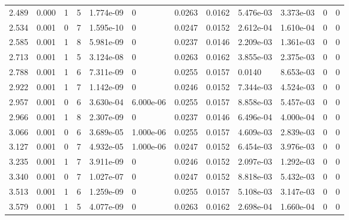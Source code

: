 \documentclass[preview]{standalone}
\begin{document}
{{\begin{tabular}{L{1.2cm}C{1.2cm} C{0.3cm}C{0.5cm} C{1.4cm}C{1.4cm} C{1.4cm}C{1.4cm} C{1.6cm}C{1.6cm} C{1.6cm}C{1.6cm}}
  2.489  &  0.000  & 1     &  5 &  1.774e-09  & 0  &  0.0263&   0.0162& 5.476e-03 & 3.373e-03   &  0 & 0  \\ 
  2.534  &  0.001  & 0     &  7 &  1.595e-10  & 0  &  0.0247&   0.0152& 2.612e-04 & 1.610e-04   &  0 & 0  \\ 
  2.585  &  0.001  & 1     &  8 &  5.981e-09  & 0  &  0.0237&   0.0146& 2.209e-03 & 1.361e-03   &  0 & 0  \\ 
  2.713  &  0.001  & 1     &  5 &  3.124e-08  & 0  &  0.0263&   0.0162& 3.855e-03 & 2.375e-03   &  0 & 0  \\ 
  2.788  &  0.001  & 1     &  6 &  7.311e-09  & 0  &  0.0255&   0.0157& 0.0140 & 8.653e-03   &  0 & 0  \\ 
  2.922  &  0.001  & 1     &  7 &  1.142e-09  & 0  &  0.0246&   0.0152& 7.344e-03 & 4.524e-03   &  0 & 0  \\ 
  2.957  &  0.001  & 0     &  6 &  3.630e-04  & 6.000e-06  &  0.0255&   0.0157& 8.858e-03 & 5.457e-03   &  0 & 0  \\ 
  2.966  &  0.001  & 1     &  8 &  2.307e-09  & 0  &  0.0237&   0.0146& 6.496e-04 & 4.000e-04   &  0 & 0  \\ 
  3.066  &  0.001  & 0     &  6 &  3.689e-05  & 1.000e-06  &  0.0255&   0.0157& 4.609e-03 & 2.839e-03   &  0 & 0  \\ 
  3.127  &  0.001  & 0     &  7 &  4.932e-05  & 1.000e-06  &  0.0247&   0.0152& 6.454e-03 & 3.976e-03   &  0 & 0  \\ 
  3.235  &  0.001  & 1     &  7 &  3.911e-09  & 0  &  0.0246&   0.0152& 2.097e-03 & 1.292e-03   &  0 & 0  \\ 
  3.340  &  0.001  & 0     &  7 &  1.027e-07  & 0  &  0.0247&   0.0152& 8.818e-03 & 5.432e-03   &  0 & 0  \\ 
  3.513  &  0.001  & 1     &  6 &  1.259e-09  & 0  &  0.0255&   0.0157& 5.108e-03 & 3.147e-03   &  0 & 0  \\ 
  3.579  &  0.001  & 1     &  5 &  4.077e-09  & 0  &  0.0263&   0.0162& 2.698e-04 & 1.660e-04   &  0 & 0  \\ 
\hline 
\end{tabular} 

}}
\end{document}
